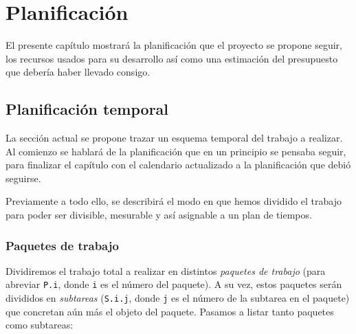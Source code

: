 \chapter{Planificación}\label{chap:Plan}
El presente capítulo mostrará la planificación que el proyecto se propone seguir, los recursos usados para su desarrollo así como una estimación del presupuesto que debería haber llevado consigo.

\section{Planificación temporal}
La sección actual se propone trazar un esquema temporal del trabajo a realizar. Al comienzo se hablará de la planificación que en un principio se pensaba seguir, para finalizar el capítulo con el calendario actualizado a la planificación que debió seguirse.

Previamente a todo ello, se describirá el modo en que hemos dividido el trabajo para poder ser divisible, mesurable y así asignable a un plan de tiempos.

\subsection{Paquetes de trabajo}
Dividiremos el trabajo total a realizar en distintos \textit{paquetes de trabajo} (para abreviar \texttt{P.i}, donde \texttt{i} es el número del paquete). A su vez, estos paquetes serán divididos en \textit{subtareas} (\texttt{S.i.j}, donde \texttt{j} es el número de la subtarea en el paquete) que concretan aún más el objeto del paquete. Pasamos a listar tanto paquetes como subtareas:

